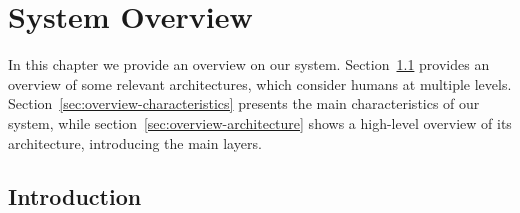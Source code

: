 
\chapter{System Overview}
\label{chapter:system_overview}



In this chapter we provide an overview on our system. Section~\ref{sec:overview-intro} provides an overview of some relevant architectures, which consider humans at multiple levels. Section~\ref{sec:overview-characteristics} presents the main characteristics of our system, while section~\ref{sec:overview-architecture} shows a high-level overview of its architecture, introducing the main layers. 

\section{Introduction}
\label{sec:overview-intro}

